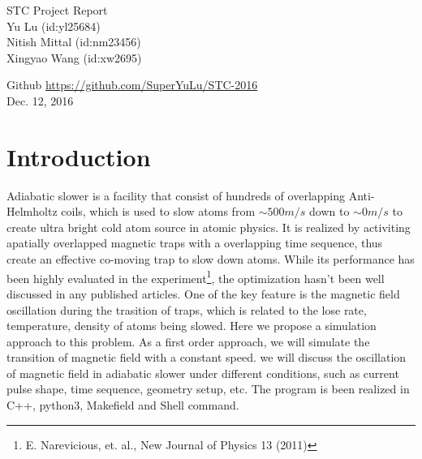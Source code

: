 \documentclass[11pt, xcolor=dvipsnames]{article}
\begin{document}
\begingroup  
  \centering
  \LARGE STC Project Report\\[0.5em]
  \large Yu Lu (id:yl25684) \\  Nitish Mittal (id:nm23456)\\Xingyao Wang (id:xw2695)\\[0.5em]\par
  \large Github \url{https://github.com/SuperYuLu/STC-2016} \\ [5mm]
  \large Dec. 12, 2016\\
  \endgroup
  
\section{Introduction}
Adiabatic slower is a facility that consist of hundreds of overlapping Anti-Helmholtz coils, which is used to slow atoms from $\sim 500 m/s$ down to $\sim 0 m/s$ to create ultra bright cold atom source in atomic physics. It is realized by activiting apatially overlapped magnetic traps with a overlapping time sequence, thus create an effective co-moving trap to slow down atoms. While its performance has been highly evaluated in the experiment\footnote{E. Narevicious, et. al., New Journal of Physics 13 (2011)}, the optimization hasn't been well discussed in any published articles. One of the key feature is the magnetic field oscillation during the trasition of traps, which is related to the lose rate, temperature, density of atoms being slowed. Here we propose a simulation approach to this problem. As a first order approach, we will simulate the transition of magnetic field with a constant speed. we will discuss the oscillation of magnetic field in adiabatic slower under different conditions, such as current pulse shape, time sequence, geometry setup, etc. The program is been realized in C++, python3, Makefield and Shell  command.
\end{document}
